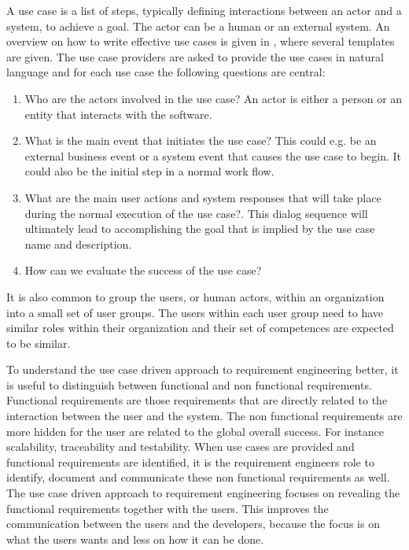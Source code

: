 A use case is a list of steps, typically defining interactions between an actor and a system, to achieve a goal. The actor can be a human or an external system.  An overview on how to write effective use cases is given in \cite{Coc01}, where several templates are given. The use case providers are asked to provide the use cases in natural language and for each use case the following questions are central:

\begin{enumerate}
\item Who are the actors involved in the use case? An actor is either a person or an entity that interacts with the software.  
\item What is the main event that initiates the use case? This could e.g. be an external business event or a system event that causes the use case to begin.  It could also be the initial step in a normal work flow. 
\item What are the main user actions and system responses that will take place during the normal execution of the use case?. This dialog sequence will ultimately lead to accomplishing the goal that is implied by the use case name and description.
\item How can we evaluate the success of the use case?
\end{enumerate}
 
It is also common to group the users, or human actors, within an organization into a small set of user groups. The users within each user group need to have similar roles within their organization and their set of competences are expected to be similar. 

To understand the use case driven approach to requirement engineering better, it is useful to distinguish between functional and non functional requirements.  Functional requirements are those requirements that are directly related to the interaction between the user and the system.  The non functional requirements are more hidden for the user are related to the global overall success.  For instance scalability, traceability and testability.  When use cases are provided and functional requirements are identified, it is the requirement engineers role to identify, document and communicate these non functional requirements as well.  The use case driven approach to requirement engineering focuses on revealing the functional requirements together with the users.  This improves the communication between the users and the developers, because the focus is on what the users wants and less on how it can be done.
